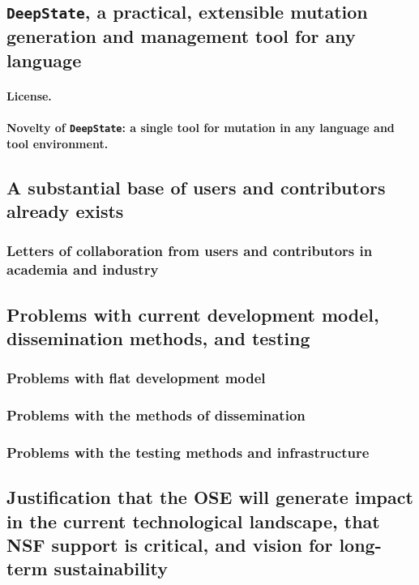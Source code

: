 \documentclass[numbers]{proposalnsf}
\newcommand{\ds}{\texttt{DeepState}}
\begin{document}
\subsection{\ds,  a practical, extensible mutation generation and management tool for any language}

\paragraph{License.}

\paragraph{Novelty of \ds: a single tool for mutation in any language and tool environment.}



\subsection{A substantial base of users and contributors already exists}

\subsubsection{Letters of collaboration from users and contributors in academia and industry}


\subsection{Problems with current development model, dissemination methods, and testing}

\subsubsection{Problems with flat development model}

\subsubsection{Problems with the methods of dissemination}

\subsubsection{Problems with the testing methods and infrastructure}

\subsection{Justification that the OSE will generate impact in the current technological landscape, that NSF support is critical, and vision for long-term sustainability}
\end{document}
